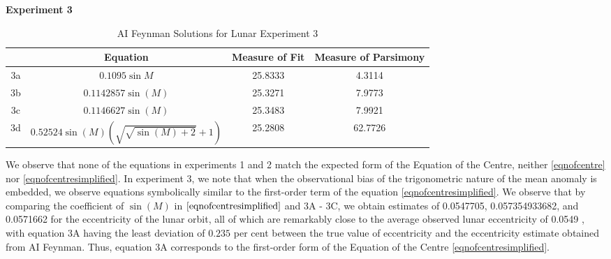 \documentclass[fleqn,10pt]{olplainarticle}
\numberwithin{equation}{subsection}
\begin{document}
\textbf{Experiment 3}
\renewcommand{\arraystretch}{3}
\begin{table}[H]
    \centering
    \begin{tabular}{|c|c|c|c|}\hline
         &\textbf{Equation} & \textbf{Measure of Fit} & \textbf{Measure of Parsimony} \\\hline
         3a & $0.1095\sin M$ & 25.8333 & 4.3114 \\\hline
         3b & $0.1142857\sin(M)$ & 25.3271 & 7.9773 \\\hline
         3c & $0.1146627\sin(M)$ & 25.3483 & 7.9921 \\\hline
         3d & $0.52524 \sin(M)\left(\sqrt{\sqrt{\sin(M)+2}}+1\right)$ & 25.2808 & 62.7726 \\\hline
    \end{tabular}
    \caption{AI Feynman Solutions for Lunar Experiment 3}
    \label{tab:lunarExp3}
\end{table}

We observe that none of the equations in experiments 1 and 2 match the expected form of the Equation of the Centre, neither \eqref{eqnofcentre} nor \eqref{eqnofcentresimplified}. In experiment 3, we note that when the observational bias of the trigonometric nature of the mean anomaly is embedded, we observe equations symbolically similar to the first-order term of the equation \eqref{eqnofcentresimplified}. We observe that by comparing the coefficient of $\sin(M)$ in $\eqref{eqnofcentresimplified}$ and 3A - 3C, we obtain estimates of 0.0547705, 0.057354933682, and 0.0571662 for the eccentricity of the lunar orbit, all of which are remarkably close to the average observed lunar eccentricity of 0.0549 \cite{brown1896introductory}, with equation 3A having the least deviation of $0.235$ per cent between the true value of eccentricity and the eccentricity estimate obtained from AI Feynman. Thus, equation 3A corresponds to the first-order form of the Equation of the Centre \eqref{eqnofcentresimplified}.
\end{document}
